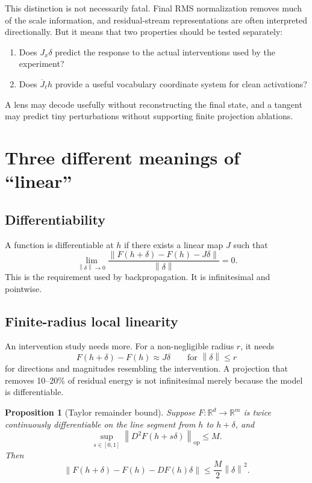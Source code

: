 \documentclass[11pt]{article}
\newcommand{\R}{\mathbb{R}}
\newcommand{\Jbar}{\overline{J}}
\newcommand{\Norm}[1]{\left\lVert #1 \right\rVert}
\newtheorem{proposition}{Proposition}
\theoremstyle{definition}
\theoremstyle{remark}
\begin{document}
This distinction is not necessarily fatal. Final RMS normalization removes much of the scale information, and residual-stream representations are often interpreted directionally. But it means that two properties should be tested separately:
\begin{enumerate}
  \item Does $J_x\delta$ predict the response to the actual interventions used by the experiment?
  \item Does $\Jbar_\ell h$ provide a useful vocabulary coordinate system for clean activations?
\end{enumerate}
A lens may decode usefully without reconstructing the final state, and a tangent may predict tiny perturbations without supporting finite projection ablations.

\section{Three different meanings of ``linear''}

\subsection{Differentiability}
A function is differentiable at $h$ if there exists a linear map $J$ such that
\[
  \lim_{\Norm{\delta}\to 0}
  \frac{\Norm{F(h+\delta)-F(h)-J\delta}}{\Norm{\delta}}=0.
\]
This is the requirement used by backpropagation. It is infinitesimal and pointwise.

\subsection{Finite-radius local linearity}
An intervention study needs more. For a non-negligible radius $r$, it needs
\begin{equation}
  F(h+\delta)-F(h)\approx J\delta
  \qquad \text{for }\Norm{\delta}\le r
  \label{eq:finite_radius}
\end{equation}
for directions and magnitudes resembling the intervention. A projection that removes 10--20\% of residual energy is not infinitesimal merely because the model is differentiable.

\begin{proposition}[Taylor remainder bound]
Suppose $F:\R^d\to\R^m$ is twice continuously differentiable on the line segment from $h$ to $h+\delta$, and
\[
  \sup_{s\in[0,1]}\Norm{D^2F(h+s\delta)}_{\mathrm{op}}\le M.
\]
Then
\begin{equation}
  \Norm{F(h+\delta)-F(h)-DF(h)\delta}
  \le \frac{M}{2}\Norm{\delta}^2.
  \label{eq:taylor_bound}
\end{equation}
\end{proposition}
\end{document}
